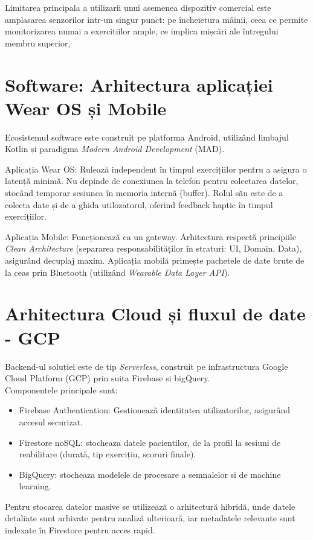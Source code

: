 Limitarea principala a utilizarii unui asemenea dispozitiv comercial este amplasarea senzorilor
intr-un singur punct: pe încheietura mâinii, 
ceea ce permite monitorizarea numai a exercitiilor ample, ce implica mișcări ale întregului membru superior,

\section{Software: Arhitectura aplicației Wear OS și Mobile}
\hspace{0.75cm}Ecosistemul software este construit pe platforma Android, utilizând limbajul Kotlin și paradigma \textit{Modern Android Development} (MAD).

Aplicația Wear OS:
Rulează independent în timpul exercițiilor pentru a asigura o latență minimă. 
Nu depinde de conexiunea la telefon pentru colectarea datelor, stocând temporar sesiunea în memoria internă 
(buffer). Rolul său este de a colecta date și de a ghida utilozatorul, oferind feedback haptic în timpul exercițiilor.

Aplicația Mobile:
Funcționează ca un gateway. Arhitectura respectă principiile \textit{Clean Architecture} 
(separarea responsabilităților în straturi: UI, Domain, Data), asigurând decuplaj maxim.
Aplicația mobilă primește pachetele de date brute de la ceas prin 
Bluetooth (utilizând \textit{Wearable Data Layer API}).

\section{Arhitectura Cloud și fluxul de date - GCP}
\hspace{0.75cm}Backend-ul soluției este de tip \textit{Serverless}, construit pe infrastructura 
Google Cloud Platform (GCP) prin suita Firebase si bigQuery. \\ 

Componentele principale sunt:
\begin{itemize}
    \item Firebase Authentication: Gestionează identitatea utilizatorilor, asigurând accesul securizat.
    \item Firestore noSQL: stocheaza datele pacientilor, de la profil la sesiuni de reabilitare (durată, tip exercițiu, scoruri finale).
    \item BigQuery: stocheaza modelele de procesare a semnalelor si de machine learning. 
\end{itemize}

\hspace{0.75cm}Pentru stocarea datelor masive se utilizează o arhitectură hibridă, unde datele 
detaliate sunt arhivate pentru analiză ulterioară, iar metadatele relevante sunt 
indexate în Firestore pentru acces rapid.